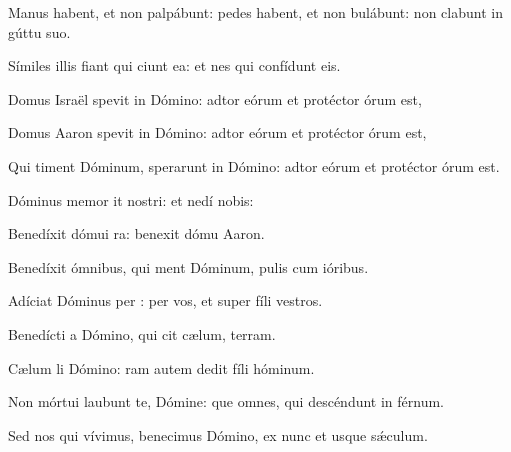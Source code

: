 \item Manus habent, et non palpábunt:\pscross{} pedes habent, et non bulábunt:\psstar{} non clabunt in gúttu suo.

\item Símiles illis fiant qui ciunt ea:\psstar{} et nes qui confídunt  eis.

\item Domus Israël spevit in Dómino:\psstar{} adtor eórum et protéctor órum est,

\item Domus Aaron spevit in Dómino:\psstar{} adtor eórum et protéctor órum est,

\item Qui timent Dóminum, sperarunt in Dómino:\psstar{} adtor eórum et protéctor órum est.

\item Dóminus memor it nostri:\psstar{} et nedí nobis:

\item Benedíxit dómui ra:\psstar{} benexit dómu Aaron.

\item Benedíxit ómnibus, qui ment Dóminum,\psstar{} pulis cum ióribus.

\item Adíciat Dóminus per :\psstar{} per vos, et super fíli vestros.

\item Benedícti  a Dómino,\psstar{} qui cit cælum,  terram.

\item Cælum li Dómino:\psstar{} ram autem dedit fíli hóminum.

\item Non mórtui laubunt te, Dómine:\psstar{} que omnes, qui descéndunt in férnum.

\item Sed nos qui vívimus, benecimus Dómino,\psstar{} ex  nunc et usque  sǽculum.

